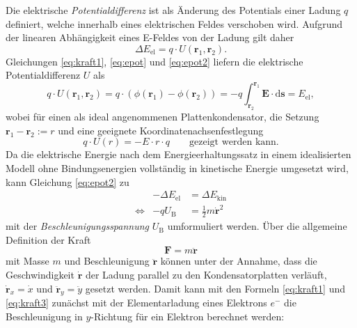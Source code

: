 Die elektrische \textit{Potentialdifferenz} ist als Änderung des Potentials einer Ladung $q$ definiert, welche innerhalb eines elektrischen Feldes verschoben wird. Aufgrund der linearen Abhängigkeit eines E-Feldes von der Ladung gilt daher
\begin{equation}
\label{eq:epot2}
\Delta E_\mathrm{el}=q\cdot U(\boldsymbol{r}_1,\boldsymbol{r}_2).
\end{equation}
Gleichungen \eqref{eq:kraft1}, \eqref{eq:epot} und \eqref{eq:epot2} liefern die elektrische Potentialdifferenz $U$ als
\begin{equation}
\label{eq:potdif1}
q\cdot U(\boldsymbol{r}_1,\boldsymbol{r}_2)=q\cdot (\phi(\boldsymbol{r}_1)-\phi(\boldsymbol{r}_2))=-q\int_{\boldsymbol{r}_2}^{\boldsymbol{r}_1}\boldsymbol{E}\cdot\mathrm{d}\boldsymbol{s}=E_\mathrm{el},
\end{equation}
wobei für einen als ideal angenommenen Plattenkondensator, die Setzung  $\boldsymbol{r}_1-\boldsymbol{r}_2:=r$ und eine geeignete Koordinatenachsenfestlegung 
\begin{equation}
\label{potdif2}
q\cdot U(r)=-E\cdot r\cdot q\qquad\text{gezeigt werden kann.}
\end{equation}
Da die elektrische Energie nach dem Energieerhaltungssatz in einem idealisierten Modell ohne Bindungsenergien vollständig in kinetische Energie umgesetzt wird, kann Gleichung \eqref{eq:epot2} zu
\begin{equation}
\begin{alignedat}{2}
\label{eq:bewegung1}
&-\Delta E_\mathrm{el}&=\Delta E_\mathrm{kin}\\
\Leftrightarrow  & -qU_\mathrm{B} &= \frac{1}{2}m\boldsymbol{\dot{r}}^2
\end{alignedat}
\end{equation}
mit der \textit{Beschleunigungsspannung} $U_\mathrm{B}$ umformuliert werden. Über die allgemeine Definition der Kraft
\begin{equation}
\label{eq:kraft3}
\boldsymbol{F}=m\boldsymbol{\ddot{r}}
\end{equation}
mit Masse $m$ und Beschleunigung $\boldsymbol{\ddot{r}}$ können unter der Annahme, dass die Geschwindigkeit $\boldsymbol{\dot{r}}$ der Ladung parallel zu den Kondensatorplatten verläuft, $\boldsymbol{\dot{r}}_x=\dot{x}$ und $\boldsymbol{\ddot{r}}_y=\ddot{y}$ gesetzt werden. Damit kann mit den Formeln \eqref{eq:kraft1} und \eqref{eq:kraft3} zunächst mit der Elementarladung eines Elektrons $e^-$ die Beschleunigung in $y$-Richtung für ein Elektron berechnet werden:
